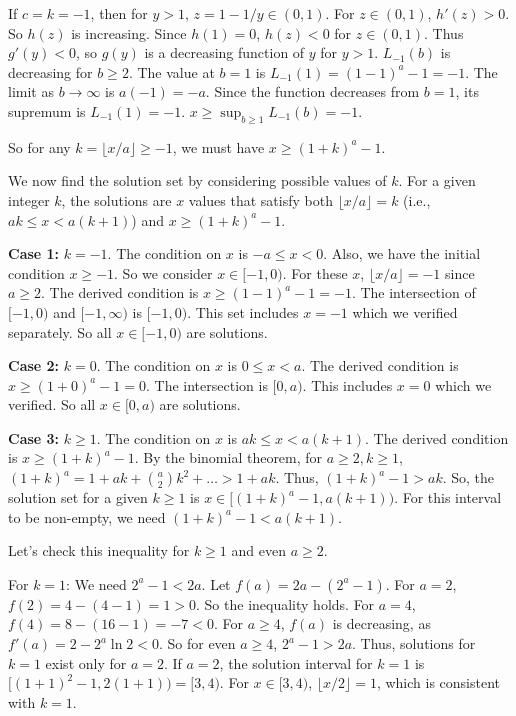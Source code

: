 \documentclass[12pt,a4paper]{article}
\theoremstyle{definition}
\begin{document}
        If $c=k=-1$, then for $y>1$, $z=1-1/y \in (0,1)$. For $z \in (0,1)$, $h'(z)>0$. So $h(z)$ is increasing. Since $h(1)=0$, $h(z)<0$ for $z \in (0,1)$. Thus $g'(y)<0$, so $g(y)$ is a decreasing function of $y$ for $y>1$.
        $L_{-1}(b)$ is decreasing for $b \geq 2$. The value at $b=1$ is $L_{-1}(1)=(1-1)^a-1=-1$. The limit as $b\to\infty$ is $a(-1)=-a$. Since the function decreases from $b=1$, its supremum is $L_{-1}(1)=-1$.
        $x \geq \sup_{b\geq 1} L_{-1}(b) = -1$.

        So for any $k=\lfloor x/a \rfloor \geq -1$, we must have $x \geq (1+k)^a-1$.

        We now find the solution set by considering possible values of $k$.
        For a given integer $k$, the solutions are $x$ values that satisfy both $\lfloor x/a \rfloor = k$ (i.e., $ak \leq x < a(k+1)$) and $x \geq (1+k)^a-1$.

        \textbf{Case 1:} $k = -1$.
        The condition on $x$ is $-a \leq x < 0$. Also, we have the initial condition $x \geq -1$. So we consider $x \in [-1,0)$. For these $x$, $\lfloor x/a \rfloor = -1$ since $a \geq 2$.
        The derived condition is $x \geq (1-1)^a-1 = -1$.
        The intersection of $[-1,0)$ and $[-1,\infty)$ is $[-1,0)$. This set includes $x=-1$ which we verified separately. So all $x \in [-1,0)$ are solutions.

        \textbf{Case 2:} $k = 0$.
        The condition on $x$ is $0 \leq x < a$.
        The derived condition is $x \geq (1+0)^a-1 = 0$.
        The intersection is $[0,a)$. This includes $x=0$ which we verified. So all $x \in [0,a)$ are solutions.

        \textbf{Case 3:} $k \geq 1$.
        The condition on $x$ is $ak \leq x < a(k+1)$.
        The derived condition is $x \geq (1+k)^a-1$.
        By the binomial theorem, for $a \geq 2, k \geq 1$, $(1+k)^a = 1+ak+\binom{a}{2}k^2+\ldots > 1+ak$.
        Thus, $(1+k)^a-1 > ak$.
        So, the solution set for a given $k \geq 1$ is $x \in [(1+k)^a-1, a(k+1))$.
        For this interval to be non-empty, we need $(1+k)^a-1 < a(k+1)$.

        Let's check this inequality for $k \geq 1$ and even $a \geq 2$.

        For $k=1$: We need $2^a-1 < 2a$.
        Let $f(a)=2a - (2^a-1)$. For $a=2$, $f(2)=4-(4-1)=1>0$. So the inequality holds.
        For $a=4$, $f(4)=8-(16-1)=-7<0$.
        For $a \geq 4$, $f(a)$ is decreasing, as $f'(a)=2-2^a\ln 2 < 0$. So for even $a \geq 4$, $2^a-1>2a$.
        Thus, solutions for $k=1$ exist only for $a=2$.
        If $a=2$, the solution interval for $k=1$ is $[(1+1)^2-1, 2(1+1)) = [3,4)$.
        For $x \in [3,4)$, $\lfloor x/2 \rfloor=1$, which is consistent with $k=1$.
\end{document}
